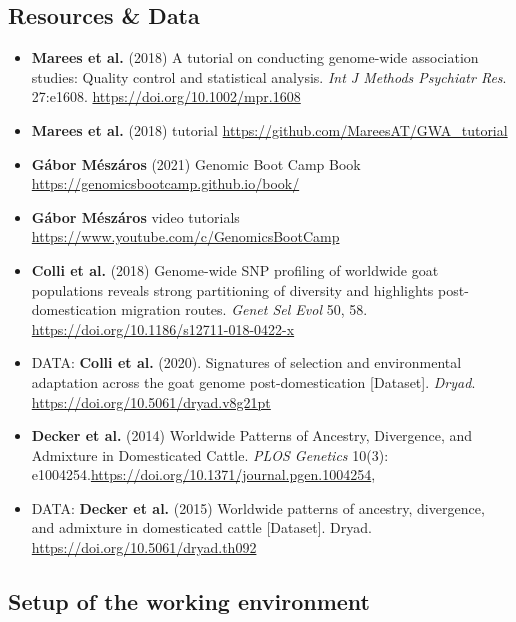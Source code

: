\hypertarget{resources-data}{%
\subsection{Resources \& Data}\label{resources-data}}

\begin{itemize}
\item
  \textbf{Marees et al.} (2018) A tutorial on conducting genome-wide
  association studies: Quality control and statistical analysis.
  \emph{Int J Methods Psychiatr Res}. 27:e1608.
  \url{https://doi.org/10.1002/mpr.1608}
\item
  \textbf{Marees et al.} (2018) tutorial
  \url{https://github.com/MareesAT/GWA_tutorial}
\item
  \textbf{Gábor Mészáros} (2021) Genomic Boot Camp Book
  \url{https://genomicsbootcamp.github.io/book/}
\item
  \textbf{Gábor Mészáros} video tutorials
  \url{https://www.youtube.com/c/GenomicsBootCamp}
\item
  \textbf{Colli et al.} (2018) Genome-wide SNP profiling of worldwide
  goat populations reveals strong partitioning of diversity and
  highlights post-domestication migration routes. \emph{Genet Sel Evol}
  50, 58. \url{https://doi.org/10.1186/s12711-018-0422-x}
\item
  DATA: \textbf{Colli et al.} (2020). Signatures of selection and
  environmental adaptation across the goat genome post-domestication
  {[}Dataset{]}. \emph{Dryad}.
  \url{https://doi.org/10.5061/dryad.v8g21pt}
\item
  \textbf{Decker et al.} (2014) Worldwide Patterns of Ancestry,
  Divergence, and Admixture in Domesticated Cattle. \emph{PLOS Genetics}
  10(3):
  e1004254.\href{https://journals.plos.org/plosgenetics/article?id=10.1371/journal.pgen.1004254}{https://doi.org/10.1371/journal.pgen.1004254},
\item
  DATA: \textbf{Decker et al.} (2015) Worldwide patterns of ancestry,
  divergence, and admixture in domesticated cattle {[}Dataset{]}. Dryad.
  \url{https://doi.org/10.5061/dryad.th092}
\end{itemize}

\hypertarget{setup-of-the-working-environment}{%
\subsection{Setup of the working
environment}\label{setup-of-the-working-environment}}

